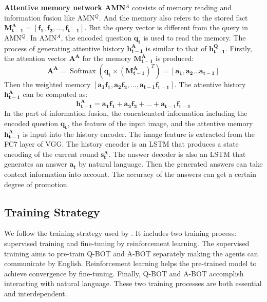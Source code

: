 \documentclass[review]{elsarticle}
\begin{document}
	\textbf{Attentive memory network AMN$^{A}$} consists of memory reading and information fusion like AMN$^{Q}$. And the memory also refers to the stored fact $\mathbf{M^{A}_{t-1}} = \left[\mathbf{f_{1}}, \mathbf{f_{2}}, \dots, \mathbf{f_{t-1}} \right]$. But the query vector is different from the query in AMN$^{Q}$. 
	In AMN$^{A}$, the encoded question $\mathbf{q_{t}}$ is used to read the memory. The process of generating attentive history $\mathbf{h^{A}_{t-1}}$ is similar to that of $\mathbf{h^{Q}_{t-1}}$. Firstly, the attention vector $\mathbf{A^{A}}$ for the memory $\mathbf{M^{A}_{t-1}}$ is produced:
	\begin{equation}
		\mathbf{A^{A}}=\operatorname{Softmax}\left(\mathbf{q_{t}} \times\left(\mathbf{M_{t-1}^{A}}\right)^{T}\right)=\left[\mathbf{a_{1}}, \mathbf{a_{2}} \dots \mathbf{a_{t-1}}\right]
		\label{Eq3}
		\end{equation}
	Then the weighted memory $\left[\mathbf{a_{1}f_{1}}, \mathbf{a_{2}f_{2}}, \dots, \mathbf{a_{t-1}f_{t-1}} \right]$. The attentive history $\mathbf{h^{A}_{t-1}}$ can be computed as:
	\begin{equation}
	\mathbf{h_{t-1}^{A}}=\mathbf{a_{1} f_{1}}+\mathbf{a_{2} f_{2}}+\ldots+\mathbf{a_{t-1} f_{t-1}}
	\label{Eq4}
	\end{equation}
	In the part of information fusion, the concatenated information including the encoded question $\mathbf{q_{t}}$, the feature of the input image, and the attentive memory $\mathbf{h^{A}_{t-1}}$ is input into the history encoder.
	The image feature is extracted from the FC7 layer of VGG. The history encoder is an LSTM that produces a state encoding of the current round $\mathbf{s^{A}_{t}}$. The answer decoder is also an LSTM that generates an answer $\mathbf{a_{t}}$ by natural language. 
	Then the generated answers can take context information into account. The accuracy of the answers can get a certain degree of promotion. 	
	
	
	\subsection{Training Strategy}
	We follow the training strategy used by \cite{DBLP:conf/iccv/DasKMLB17}. It includes two training process: supervised training and       fine-tuning by reinforcement learning. The supervised training aims to pre-train Q-BOT and A-BOT separately making the agents can communicate by English.
	Reinforcement learning helps the pre-trained model to achieve convergence by fine-tuning. Finally, Q-BOT and A-BOT accomplish interacting with natural language. These two training processes are both essential and interdependent.
	
\end{document}
